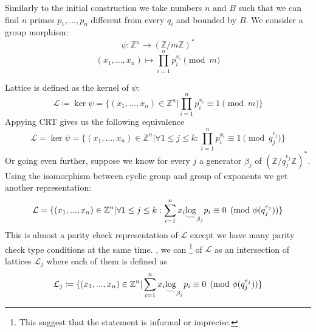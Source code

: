 \documentclass[12pt]{article}
\newcommand{\ZZ}{\mathbb{Z}}
\newcommand{\LL}{\mathcal{L}}
\def\added{\bgroup \markoverwith{\textcolor{green!50!blue}{\lower4.5pt\hbox{\sixly \char58}}}\ULon}
\def\toimprove{\bgroup \markoverwith{\textcolor{red}{\lower4.5pt\hbox{\sixly \char58}}}\ULon}
\begin{document}
Similarly to the initial construction we take numbers $n$ and $B$ such that we can find $n$ primes $p_{1}, ... , p_{n}$ different from every $q_{i}$ and bounded by $B$. We consider a group morphism:
\begin{equation}
    \psi : \ZZ^{n} \rightarrow (\ZZ/m\ZZ)^*
\end{equation}
\begin{equation}
    (x_{1}, ..., x_{n}) \mapsto \prod_{i=1}^{n}p_{i}^{x_{i}} \pmod{m}
\end{equation}

Lattice is defined as the kernel of $\psi$:
\begin{equation}
    \LL \coloneqq \ker \psi = \{(x_{1}, ..., x_{n}) \in \ZZ^{n} | \prod_{i=1}^{n}p_{i}^{x_{i}} \equiv 1 \pmod{m}\}
\end{equation}
Appying \added{the} CRT gives us the following equivalence
\begin{equation}
    \LL = \ker \psi = \{(x_{1}, ..., x_{n}) \in \ZZ^{n} |  \forall 1 \leq j \leq k: \prod_{i=1}^{n}p_{i}^{x_{i}} \equiv 1 \pmod{q_{j}^{e_{j}}}\}
\end{equation}
Or going even further, suppose we know for every $j$ a generator ${\beta_{j}}$ of  $(\ZZ/q_{j}^{e_{j}}\ZZ)^*$. Using the isomorphism between cyclic group and group of exponents we get another representation:
\begin{equation}
    \LL = \{(x_{1}, ..., x_{n}) \in \ZZ^{n} |  \forall 1 \leq j \leq k: \sum_{i=1}^{n}x_{i}\added{\log}_{\beta_{j}}p_{i}\equiv 0 \pmod{\phi(q_{j}^{e_{j}})}\}
\end{equation}
This is almost a parity check representation of $\LL$ except we have many parity check type conditions at the same time. \toimprove{So}, we can \toimprove{think}\footnote{This suggest that the statement is informal or imprecise.} of $\LL$ as an intersection of lattices $\LL_{j}$ where each of them is defined as
\begin{equation}
    \LL_{j} \coloneqq \{(x_{1}, ..., x_{n}) \in \ZZ^{n} | \sum_{i=1}^{n}x_{i}\added{\log}_{\beta_{j}}p_{i}\equiv 0 \pmod{\phi(q_{j}^{e_{j}})}\}
\end{equation}
\end{document}
